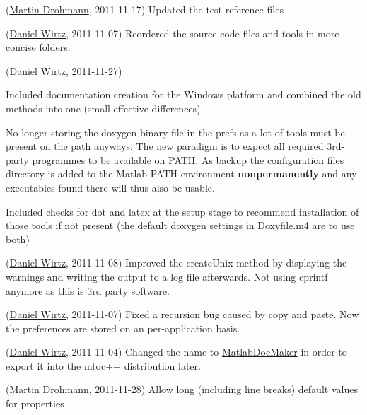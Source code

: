 \begin{DoxyRefList}
\item[\label{changelog1_2__changelog1_2000010}%
\hypertarget{changelog1_2__changelog1_2000010}{}%
Page \hyperlink{changes}{Changes and new features in mtoc++} ](\hyperlink{developers_md}{Martin Drohmann}, 2011-\/11-\/17) Updated the test reference files

(\hyperlink{developers_dw}{Daniel Wirtz}, 2011-\/11-\/07) Reordered the source code files and tools in more concise folders. 
\item[\label{changelog1_2__changelog1_2000001}%
\hypertarget{changelog1_2__changelog1_2000001}{}%
Class \hyperlink{class_matlab_doc_maker}{Matlab\+Doc\+Maker} ](\hyperlink{developers_dw}{Daniel Wirtz}, 2011-\/11-\/27)
\begin{DoxyItemize}
\item Included documentation creation for the Windows platform and combined the old methods into one (small effective differences)
\item No longer storing the doxygen binary file in the prefs as a lot of tools must be present on the path anyways. The new paradigm is to expect all required 3rd-\/party programmes to be available on P\+A\+T\+H. As backup the configuration files directory is added to the Matlab P\+A\+T\+H environment {\bfseries nonpermanently} and any executables found there will thus also be usable.
\item Included checks for {\ttfamily dot} and {\ttfamily latex} at the setup stage to recommend installation of those tools if not present (the default doxygen settings in Doxyfile.\+m4 are to use both)
\end{DoxyItemize}

(\hyperlink{developers_dw}{Daniel Wirtz}, 2011-\/11-\/08) Improved the create\+Unix method by displaying the warnings and writing the output to a log file afterwards. Not using cprintf anymore as this is 3rd party software.

(\hyperlink{developers_dw}{Daniel Wirtz}, 2011-\/11-\/07) Fixed a recursion bug caused by copy and paste. Now the preferences are stored on an per-\/application basis.

(\hyperlink{developers_dw}{Daniel Wirtz}, 2011-\/11-\/04) Changed the name to \hyperlink{class_matlab_doc_maker}{Matlab\+Doc\+Maker} in order to export it into the mtoc++ distribution later. 
\item[\label{changelog1_2__changelog1_2000005}%
\hypertarget{changelog1_2__changelog1_2000005}{}%
Class \hyperlink{class_m_file_scanner}{M\+File\+Scanner} ](\hyperlink{developers_md}{Martin Drohmann}, 2011-\/11-\/28) Allow long (including line breaks) default values for properties


\end{DoxyRefList}
